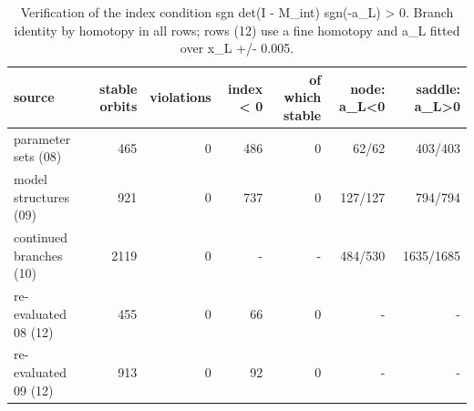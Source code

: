 \begin{table}
\caption{Verification of the index condition sgn det(I - M\_int) sgn(-a\_L) > 0. Branch identity by homotopy in all rows; rows (12) use a fine homotopy and a\_L fitted over x\_L +/- 0.005.}
\label{tab:T2_index_verification}
\begin{ruledtabular}
\begin{tabular}{lrrrrrr}
source & stable orbits & violations & index < 0 & of which stable & node: a\_L<0 & saddle: a\_L>0 \\
\hline
parameter sets (08) & 465 & 0 & 486 & 0 & 62/62 & 403/403 \\
model structures (09) & 921 & 0 & 737 & 0 & 127/127 & 794/794 \\
continued branches (10) & 2119 & 0 & - & - & 484/530 & 1635/1685 \\
re-evaluated 08 (12) & 455 & 0 & 66 & 0 & - & - \\
re-evaluated 09 (12) & 913 & 0 & 92 & 0 & - & - \\
\end{tabular}
\end{ruledtabular}
\end{table}